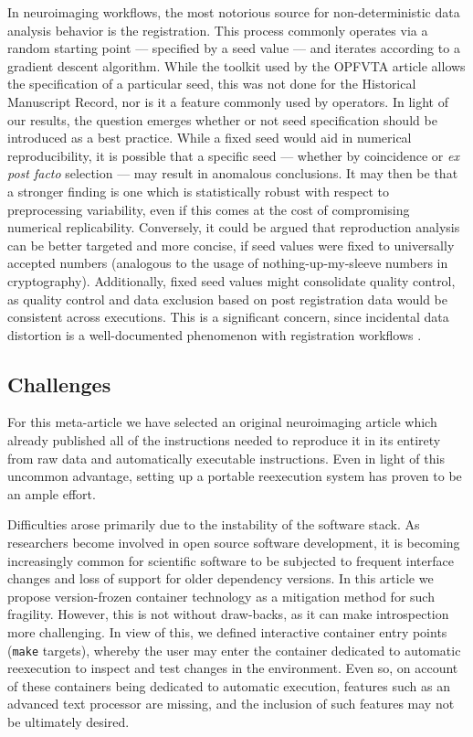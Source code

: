 In neuroimaging workflows, the most notorious source for non-deterministic data analysis behavior is the registration.
This process commonly operates via a random starting point — specified by a seed value — and iterates according to a gradient descent algorithm.
While the toolkit used by the OPFVTA article allows the specification of a particular seed, this was not done for the Historical Manuscript Record, nor is it a feature commonly used by operators.
In light of our results, the question emerges whether or not seed specification should be introduced as a best practice.
While a fixed seed would aid in numerical reproducibility, it is possible that a specific seed — whether by coincidence or \textit{ex post facto} selection — may result in anomalous conclusions.
It may then be that a stronger finding is one which is statistically robust with respect to preprocessing variability, even if this comes at the cost of compromising numerical replicability.
Conversely, it could be argued that reproduction analysis can be better targeted and more concise, if seed values were fixed to universally accepted numbers (analogous to the usage of nothing-up-my-sleeve numbers in cryptography).
Additionally, fixed seed values might consolidate quality control, as quality control and data exclusion based on post registration data would be consistent across executions.
This is a significant concern, since incidental data distortion is a well-documented phenomenon with registration workflows \cite{irsabi}.

\subsection{Challenges}
For this meta-article we have selected an original neuroimaging article which already published all of the instructions needed to reproduce it in its entirety from raw data and automatically executable instructions.
Even in light of this uncommon advantage, setting up a portable reexecution system has proven to be an ample effort.

Difficulties arose primarily due to the instability of the software stack.
As researchers become involved in open source software development, it is becoming increasingly common for scientific software to be subjected to frequent interface changes and loss of support for older dependency versions.
In this article we propose version-frozen container technology as a mitigation method for such fragility.
However, this is not without draw-backs, as it can make introspection more challenging.
In view of this, we defined interactive container entry points (\texttt{make} targets), whereby the user may enter the container dedicated to automatic reexecution to inspect and test changes in the environment.
Even so, on account of these containers being dedicated to automatic execution, features such as an advanced text processor are missing, and the inclusion of such features may not be ultimately desired.

